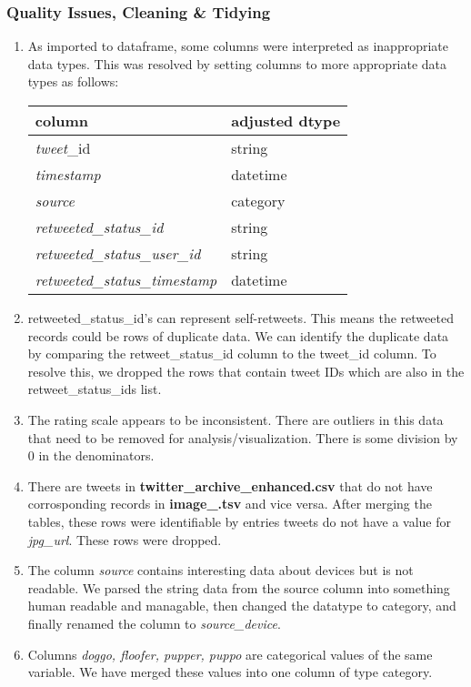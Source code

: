 \documentclass{report}
\begin{document}
		\subsubsection{Quality Issues, Cleaning & Tidying}
			\begin{enumerate}
				\item As imported to dataframe, some columns were interpreted as inappropriate data types. This was resolved by setting 
				columns to more appropriate data types as follows:\\
					\begin{tabular}{ll}
						\textbf{column} & \textbf{adjusted dtype} \\
						\midrule
						\textit{tweet}\_id & string \\
						\textit{timestamp} & datetime \\
						\textit{source} & category \\
						\textit{retweeted\_status\_id} & string \\ 
						\textit{retweeted\_status\_user\_id} & string \\ 
						\textit{retweeted\_status\_timestamp} & datetime \\    
					\end{tabular}
				\item retweeted\_status\_id's can represent self-retweets. This means the retweeted records could be
					rows of duplicate data. We can identify the duplicate data by comparing the retweet\_status\_id column to the tweet\_id column. 
					To resolve this, we dropped the rows that contain tweet IDs which are also in the retweet\_status\_ids list.
				\item The rating scale appears to be inconsistent. There are outliers in this data that need 
					to be removed for analysis/visualization. There is some division by 0 in the denominators.
				\item There are tweets in \textbf{twitter\_archive\_enhanced.csv} that do not have corrosponding records in \textbf{image\_.tsv} and vice versa.
					After merging the tables, these rows were identifiable by entries tweets do not have a value for \textit{jpg\_url}. These rows were dropped.
				\item The column \textit{source} contains interesting data about devices but is not readable. We parsed the string data from the source column into
					something human readable and managable, then changed the datatype to category, and finally renamed the column to \textit{source\_device}.
				\item Columns \textit{doggo, floofer, pupper, puppo} are categorical values of the same variable. We have merged these values into one column of type category. 
			\end{enumerate} 
\end{document}
